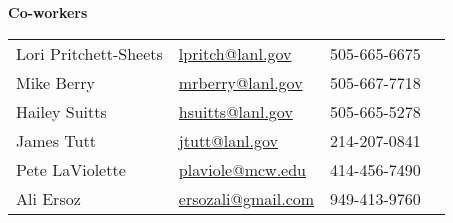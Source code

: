 \begin{minipage}{0.50\textwidth} 
	\begin{center}
		{\normalsize \textbf{Co-workers}} \vspace{1mm} %
	\end{center}
	\begin{tabular}{llll}
		Lori Pritchett-Sheets & \href{mailto:lpritch@lanl.gov}{lpritch@lanl.gov} & 505-665-6675 \\
		Mike Berry       & \href{mailto:mrberry@lanl.gov}{mrberry@lanl.gov} & 505-667-7718 \\
		Hailey Suitts    & \href{mailto:hsuitts@lanl.gov}{hsuitts@lanl.gov} & 505-665-5278 \\
		James Tutt       & \href{mailto:jtutt@lanl.gov}{jtutt@lanl.gov} & 214-207-0841 \\
		Pete LaViolette  &  \href{mailto:plaviole@mcw.edu}{plaviole@mcw.edu} & 414-456-7490 \\ %
		Ali Ersoz        &  \href{mailto:ersozali@gmail.com}{ersozali@gmail.com} & 949-413-9760 \\
	\end{tabular}
\end{minipage}





